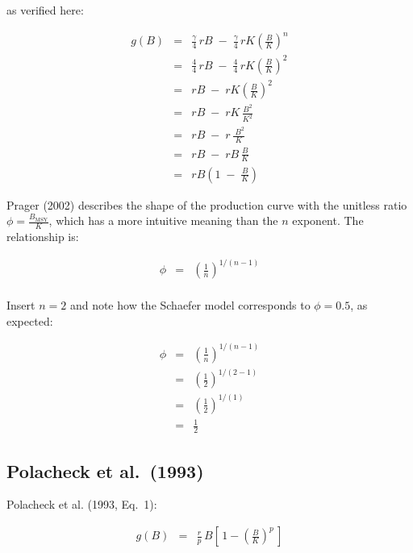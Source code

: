 \documentclass[fleqn]{article}
\newcommand{\msy}{_\mathrm{MSY}}
\begin{document}
as verified here:

\begin{eqnarray*}
  g(B) &=& \frac{\gamma}{4}\,rB \;-\;
  \frac{\gamma}{4}\,rK\!\left(\frac{B}{K}\right)^{\!\!n}\\[1em]
  ~    &=& \frac{4}{4}\,rB \;-\;
  \frac{4}{4}\,rK\!\left(\frac{B}{K}\right)^{\!2}       \\[1em]
  ~    &=& rB \;-\; rK\!\left(\frac{B}{K}\right)^{\!2}  \\[1em]
  ~    &=& rB \;-\; rK\,\frac{B^2}{K^2}                 \\[1em]
  ~    &=& rB \;-\; r\,\frac{\;B^2}{K}                  \\[1em]
  ~    &=& rB \;-\; rB\,\frac{B}{K}                     \\[1em]
  ~    &=& rB\left(1 \;-\; \frac{B}{K}\right)
\end{eqnarray*}

\newpage

Prager (2002) describes the shape of the production curve with the unitless
ratio $\phi\!=\!\frac{B\msy}{K}$, which has a more intuitive meaning than the
$n$ exponent. The relationship is:

\begin{eqnarray*}
  \phi &=& \left(\frac{1}{n}\right)^{\!1/(n-1)}\\[1ex]
\end{eqnarray*}

Insert $n\!=\!2$ and note how the Schaefer model corresponds to $\phi=0.5$, as
expected:

\begin{eqnarray*}
  \phi &=& \left(\frac{1}{n}\right)^{\!1/(n-1)}\\[1em]
  ~    &=& \left(\frac{1}{2}\right)^{\!1/(2-1)}\\[1em]
  ~    &=& \left(\frac{1}{2}\right)^{\!1/(1)}\\[1em]
  ~    &=& \frac{1}{2}
\end{eqnarray*}

\subsection{Polacheck et al.\ (1993)}

Polacheck et al. (1993, Eq.~1):

\begin{eqnarray*}
  g(B) &=& \frac{r}{p}\,B\!
  \left[\,1\!-\!\left(\frac{B}{K}\right)^p\,\right]\\[1ex]
\end{eqnarray*}
\end{document}
